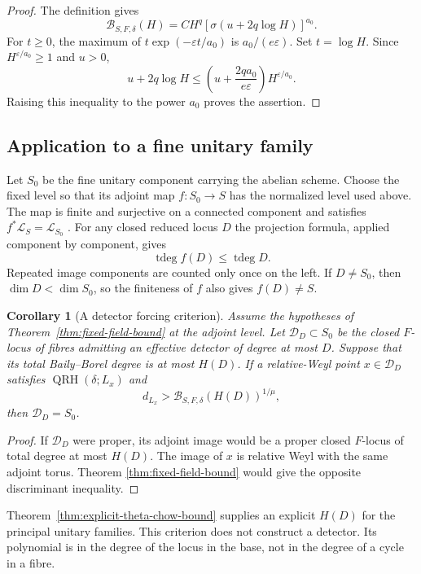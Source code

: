 \documentclass[11pt]{article}
\newtheorem{corollary}[theorem]{Corollary}
\theoremstyle{definition}
\theoremstyle{remark}
\begin{document}
\begin{proof}
The definition gives
\[
 \mathcal B_{S,F,\delta}(H)
 =CH^q\left[\sigma(u+2q\log H)\right]^{a_0}.
\]
For $t\geq0$, the maximum of $t\exp(-\varepsilon t/a_0)$ is
$a_0/(e\varepsilon)$.  Set $t=\log H$.  Since
$H^{\varepsilon/a_0}\geq1$ and $u>0$,
\[
 u+2q\log H\leq
 \left(u+\frac{2qa_0}{e\varepsilon}\right)
 H^{\varepsilon/a_0}.
\]
Raising this inequality to the power $a_0$ proves the assertion.
\end{proof}

\subsection{Application to a fine unitary family}

Let $S_0$ be the fine unitary component carrying the abelian scheme.
Choose the fixed level so that its adjoint map $f:S_0\to S$ has
the normalized level used above.  The map is finite and surjective
on a connected component and satisfies
$f^*\mathcal L_S=\mathcal L_{S_0}$
\cite[Proposition~9.4]{Jaswal}.  For any closed reduced locus $D$
the projection formula, applied component by component, gives
\[
 \operatorname{tdeg} f(D)\leq\operatorname{tdeg}D.
\]
Repeated image components are counted only once on the left.  If
$D\ne S_0$, then $\dim D<\dim S_0$, so the finiteness of $f$
also gives $f(D)\ne S$.

\begin{corollary}[A detector forcing criterion]
\label{cor:polynomial-detector}
Assume the hypotheses of Theorem~\ref{thm:fixed-field-bound} at the
adjoint level.  Let $\mathcal D_D\subset S_0$ be the closed
$F$-locus of fibres admitting an effective detector of degree at
most $D$.  Suppose that its total Baily--Borel degree is at most
$H(D)$.  If a relative-Weyl point $x\in\mathcal D_D$ satisfies
$\operatorname{QRH}(\delta;L_x)$ and
\[
 d_{L_x}>\mathcal B_{S,F,\delta}(H(D))^{1/\mu},
\]
then $\mathcal D_D=S_0$.
\end{corollary}

\begin{proof}
If $\mathcal D_D$ were proper, its adjoint image would be a proper
closed $F$-locus of total degree at most $H(D)$.  The image of $x$
is relative Weyl with the same adjoint torus.  Theorem
\ref{thm:fixed-field-bound} would give the opposite discriminant
inequality.
\end{proof}

Theorem~\ref{thm:explicit-theta-chow-bound} supplies an explicit
$H(D)$ for the principal unitary families.  This criterion does not construct a
detector.  Its polynomial is in the degree of the locus in the base,
not in the degree of a cycle in a fibre.
\end{document}
